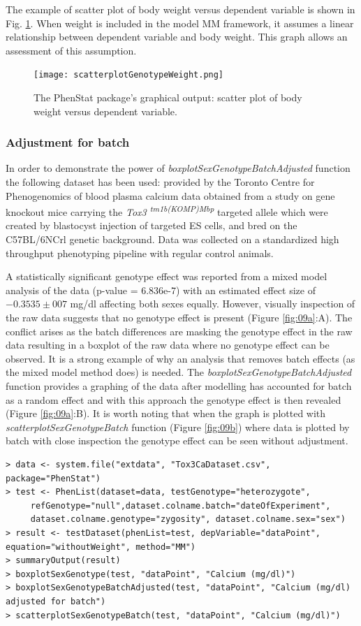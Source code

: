 \documentclass[12pt,a4paper]{article}
\begin{document}
The example of scatter plot of body weight versus dependent variable is shown in Fig. \ref{fig:09}. When weight is included in the model MM framework, it assumes a linear relationship between dependent variable and body weight. This graph allows an assessment of this assumption. 
\begin{figure}[!htpb]%
\centerline{\texttt{[image: scatterplotGenotypeWeight.png]}}
\caption{The PhenStat package's graphical output: scatter plot of body weight versus dependent variable.}\label{fig:09}
\end{figure}

\subsubsection{Adjustment for batch}
In order to demonstrate the power of \textit{boxplotSexGenotypeBatchAdjusted} function the following dataset has been used: provided by the Toronto Centre for Phenogenomics of blood plasma calcium data obtained from a study on gene knockout mice carrying the \textit{Tox3 \textsuperscript{tm1b(KOMP)Mbp}} targeted allele which were created by blastocyst injection of targeted ES cells, and bred on the C57BL/6NCrl  genetic background. Data was collected on a standardized high throughput phenotyping pipeline with regular control animals. 

A statistically significant genotype effect was reported from a mixed model analysis of the data (p-value = 6.836e-7) with an estimated effect size of $-0.3535 \pm 007$ mg/dl affecting both sexes equally. However, visually inspection of the raw data suggests that no genotype effect is present (Figure \ref{fig:09a}:A). The conflict arises as the batch differences are masking the genotype effect in the raw data resulting in a boxplot of the raw data where no genotype effect can be observed. It is a strong example of why an analysis that removes batch effects (as the mixed model method does) is needed. The \textit{boxplotSexGenotypeBatchAdjusted} function provides a graphing of the data after modelling has accounted for batch as a random effect and with this approach the genotype effect is then revealed (Figure \ref{fig:09a}:B). It is worth noting that when the graph is plotted with \textit{scatterplotSexGenotypeBatch} function (Figure \ref{fig:09b}) where data is plotted by batch with close inspection the genotype effect can be seen without adjustment.

\begingroup
\fontsize{8pt}{12pt}\selectfont
\begin{verbatim}
> data <- system.file("extdata", "Tox3CaDataset.csv", package="PhenStat")  
> test <- PhenList(dataset=data, testGenotype="heterozygote",	
	 refGenotype="null",dataset.colname.batch="dateOfExperiment",
	 dataset.colname.genotype="zygosity", dataset.colname.sex="sex")
> result <- testDataset(phenList=test, depVariable="dataPoint", equation="withoutWeight", method="MM")
> summaryOutput(result)
> boxplotSexGenotype(test, "dataPoint", "Calcium (mg/dl)")
> boxplotSexGenotypeBatchAdjusted(test, "dataPoint", "Calcium (mg/dl) adjusted for batch")
> scatterplotSexGenotypeBatch(test, "dataPoint", "Calcium (mg/dl)")
\end{verbatim}
\endgroup 
\end{document}
